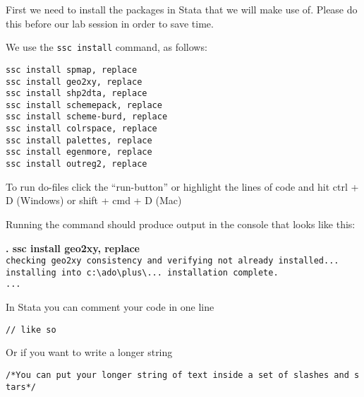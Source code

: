 \documentclass[
  letterpaper,
  DIV=11,
  numbers=noendperiod]{scrartcl}
\begin{document}
First we need to install the packages in Stata that we will make use of.
Please do this before our lab session in order to save time.

We use the \texttt{ssc\ install} command, as follows:

\begin{verbatim}
ssc install spmap, replace
ssc install geo2xy, replace
ssc install shp2dta, replace
ssc install schemepack, replace
ssc install scheme-burd, replace
ssc install colrspace, replace
ssc install palettes, replace
ssc install egenmore, replace
ssc install outreg2, replace
\end{verbatim}

\begin{tcolorbox}[enhanced jigsaw, toptitle=1mm, colbacktitle=quarto-callout-note-color!10!white, title=\textcolor{quarto-callout-note-color}{\faInfo}\hspace{0.5em}{Note}, opacityback=0, opacitybacktitle=0.6, colback=white, leftrule=.75mm, bottomtitle=1mm, breakable, rightrule=.15mm, arc=.35mm, titlerule=0mm, colframe=quarto-callout-note-color-frame, toprule=.15mm, bottomrule=.15mm, left=2mm, coltitle=black]

To run do-files click the ``run-button'' or highlight the lines of code
and hit ctrl + D (Windows) or shift + cmd + D (Mac)

\end{tcolorbox}

Running the command should produce output in the console that looks like
this:

\textbf{. ssc install geo2xy, replace}\\
\hspace*{0.333em}\hspace*{0.333em}\texttt{checking\ geo2xy\ consistency\ and\ verifying\ not\ already\ installed...}\\
\hspace*{0.333em}\hspace*{0.333em}\texttt{installing\ into\ c:\textbackslash{}ado\textbackslash{}plus\textbackslash{}...\ installation\ complete.}\\
\hspace*{0.333em}\hspace*{0.333em}\texttt{...}

\begin{tcolorbox}[enhanced jigsaw, toptitle=1mm, colbacktitle=quarto-callout-tip-color!10!white, title=\textcolor{quarto-callout-tip-color}{\faLightbulb}\hspace{0.5em}{always comment your code}, opacityback=0, opacitybacktitle=0.6, colback=white, leftrule=.75mm, bottomtitle=1mm, breakable, rightrule=.15mm, arc=.35mm, titlerule=0mm, colframe=quarto-callout-tip-color-frame, toprule=.15mm, bottomrule=.15mm, left=2mm, coltitle=black]

In Stata you can comment your code in one line

\texttt{//\ like\ so}

Or if you want to write a longer string

\texttt{/*You\ can\ put\ your\ longer\ string\ of\ text\ inside\ a\ set\ of\ slashes\ and\ stars*/}

\end{tcolorbox}
\end{document}
